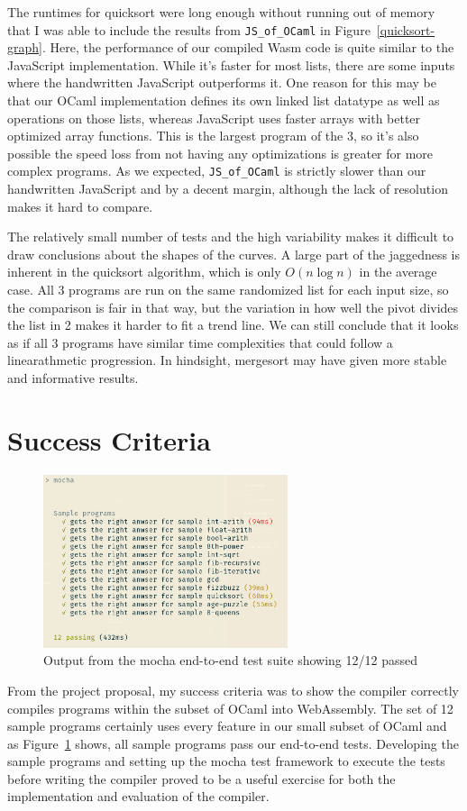 \documentclass[12pt,a4paper,twoside,openright]{report}
\newcommand{\JSofOCaml}{{\tt JS\_of\_OCaml} }
\begin{document}
The runtimes for quicksort were long enough without running out of memory that I was able to include the results from \JSofOCaml in Figure~\ref{quicksort-graph}.
Here, the performance of our compiled Wasm code is quite similar to the JavaScript implementation.
While it's faster for most lists, there are some inputs where the handwritten JavaScript outperforms it.
One reason for this may be that our OCaml implementation defines its own linked list datatype as well as operations on those lists, whereas JavaScript uses faster arrays with better optimized array functions.
This is the largest program of the 3, so it's also possible the speed loss from not having any optimizations is greater for more complex programs.
As we expected, \JSofOCaml is strictly slower than our handwritten JavaScript and by a decent margin, although the lack of resolution makes it hard to compare.

The relatively small number of tests and the high variability makes it difficult to draw conclusions about the shapes of the curves.
A large part of the jaggedness is inherent in the quicksort algorithm, which is only $O(n \log n)$ in the average case.
All 3 programs are run on the same randomized list for each input size, so the comparison is fair in that way, but the variation in how well the pivot divides the list in 2 makes it harder to fit a trend line.
We can still conclude that it looks as if all 3 programs have similar time complexities that could follow a linearathmetic progression.
In hindsight, mergesort may have given more stable and informative results.

\section{Success Criteria}
\begin{figure}[tbh]
   \centerline{\includegraphics[height=2in]{passed-tests}}
\caption{Output from the mocha end-to-end test suite showing 12/12 passed}
\label{passed-tests}
\end{figure}
From the project proposal, my success criteria was to show the compiler correctly compiles programs within the subset of OCaml into WebAssembly.
The set of 12 sample programs certainly uses every feature in our small subset of OCaml and as Figure~\ref{passed-tests} shows, all sample programs pass our end-to-end tests.
Developing the sample programs and setting up the mocha test framework to execute the tests before writing the compiler proved to be a useful exercise for both the implementation and evaluation of the compiler.
\end{document}
